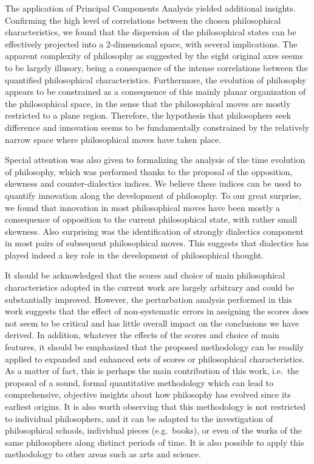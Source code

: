 \documentclass[%
 aip,
 jmp,%
 amsmath,amssymb,
 reprint,%
]{revtex4-1}
\begin{document}
The application of Principal Components Analysis yielded additional
insights.  Confirming the high level of correlations between the
chosen philosophical characteristics, we found that the dispersion of
the philosophical states can be effectively projected into a
2-dimensional space, with several implications.  The apparent
complexity of philosophy as suggested by the eight original axes seems
to be largely illusory, being a consequence of the intense
correlations between the quantified philosophical characteristics.
Furthermore, the evolution of philosophy appears to be constrained as
a consequence of this mainly planar organization of the philosophical
space, in the sense that the philosophical moves are mostly restricted
to a plane region. Therefore, the hypothesis that philosophers seek
difference and innovation seems to be fundamentally constrained by the
relatively narrow space where philosophical moves have taken place.

Special attention was also given to formalizing the analysis of the
time evolution of philosophy, which was performed thanks to the
proposal of the opposition, skewness and counter-dialectics indices.
We believe these indices can be used to quantify innovation along the
development of philosophy.  To our great surprise, we found that
innovation in most philosophical moves have been mostly a consequence
of opposition to the current philosophical state, with rather small
skewness.  Also surprising was the identification of strongly
dialectics component in most pairs of subsequent philosophical moves.
This suggests that dialectics has played indeed a key role in the
development of philosophical thought.

It should be acknowledged that the scores and choice of main
philosophical characteristics adopted in the current work are largely
arbitrary and could be substantially improved.  However, the
perturbation analysis performed in this work suggests that the effect
of non-systematic errors in assigning the scores does not seem to be
critical and has little overall impact on the conclusions we have
derived.  In addition, whatever the effects of the scores and choice
of main features, it should be emphasized that the proposed
methodology can be readily applied to expanded and enhanced sets of
scores or philosophical characteristics.  As a matter of fact, this is
perhaps the main contribution of this work, i.e.\ the proposal of a
sound, formal quantitative methodology which can lead to
comprehensive, objective insights about how philosophy has evolved
since its earliest origins.  It is also worth observing that this
methodology is not restricted to individual philosophers, and it can
be adapted to the investigation of philosophical schools, individual
pieces (e.g.\ books), or even of the works of the same philosophers
along distinct periods of time.  It is also possible to apply this
methodology to other areas such as arts and science.
\end{document}
